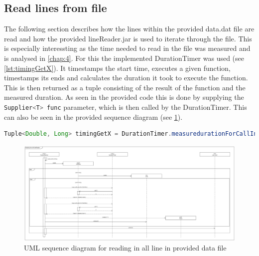\subsection{Read lines from file}
The following section describes how the lines within the provided data.dat file are read and how the provided lineReader.jar is used to iterate through the file. This is especially interessting as the time needed to read in the file was measured and is analysed in \ref{chap:4}. For this the implemented DurationTimer was used (see \ref{lst:timingGetX}). It timestamps the start time, executes a given function, timestamps its ends and calculates the duration it took to execute the function. This is then returned as a tuple consisting of the result of the function and the measured duration. As seen in the provided code this is done by supplying the \lstinline[language=java]{Supplier<T> func} parameter, which is then called by the DurationTimer. This can also be seen in the provided sequence diagram (see \ref{fig:seq_read}).

\begin{lstlisting}[language=java, caption=Time measurement for getX with Supplier pattern, label=lst:timingGetX]
    Tuple<Double, Long> timingGetX = DurationTimer.measuredurationForCallInMs(() -> reader.getX());
\end{lstlisting}

\begin{landscape}
    \begin{figure}
        \begin{center}
            \includegraphics[width=1.75\textwidth, height=0.99\textheight]{img/sequence_read.png}
            \caption{UML sequence diagram for reading in all line in provided data file}
            \label{fig:seq_read}
        \end{center}
    \end{figure}
\end{landscape}
